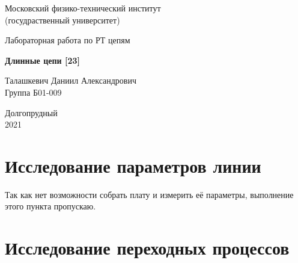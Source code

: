 \documentclass[a4paper, 14pt]{extarticle}%
\date{}
\begin{document}
\begin{titlepage}

	\newpage
	\begin{center}
		\normalsize Московский физико-технический институт \\(госудраственный 			университет)
	\end{center}

	\vspace{6em}

	\begin{center}
		\Large Лабораторная работа по РТ цепям\\
	\end{center}

	\vspace{1em}

	\begin{center}
		\large \textbf{Длинные цепи [23]}
	\end{center}

	\vspace{2em}

	\begin{center}
		\large Талашкевич Даниил Александрович\\
		Группа Б01-009
	\end{center}

	\vspace{\fill}

	\begin{center}
	Долгопрудный \\2021
	\end{center}
	
\end{titlepage}



	\thispagestyle{empty}
	\newpage
	\tableofcontents
	\newpage
	\setcounter{page}{1}


\section{Исследование параметров линии}

Так как нет возможности собрать плату и измерить её параметры, выполнение этого пункта пропускаю.

\section{Исследование переходных процессов}
\end{document}
